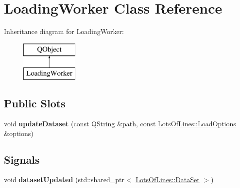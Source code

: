 \hypertarget{class_loading_worker}{}\section{Loading\+Worker Class Reference}
\label{class_loading_worker}
Inheritance diagram for Loading\+Worker\+:\begin{figure}[H]
\begin{center}
\leavevmode
\includegraphics[height=2.000000cm]{class_loading_worker}
\end{center}
\end{figure}
\subsection*{Public Slots}
\begin{DoxyCompactItemize}
\item 
void {\bfseries update\+Dataset} (const Q\+String \&path, const \hyperlink{struct_lots_of_lines_1_1_load_options}{Lots\+Of\+Lines\+::\+Load\+Options} \&options)\hypertarget{class_loading_worker_ab73de964995a1e14a0e58829b0a8c23c}{}\label{class_loading_worker_ab73de964995a1e14a0e58829b0a8c23c}

\end{DoxyCompactItemize}
\subsection*{Signals}
\begin{DoxyCompactItemize}
\item 
void {\bfseries dataset\+Updated} (std\+::shared\+\_\+ptr$<$ \hyperlink{class_lots_of_lines_1_1_data_set}{Lots\+Of\+Lines\+::\+Data\+Set} $>$)\hypertarget{class_loading_worker_ae10e9b2b8b006cc6ca04e5f9f78ff729}{}\label{class_loading_worker_ae10e9b2b8b006cc6ca04e5f9f78ff729}

\end{DoxyCompactItemize}

